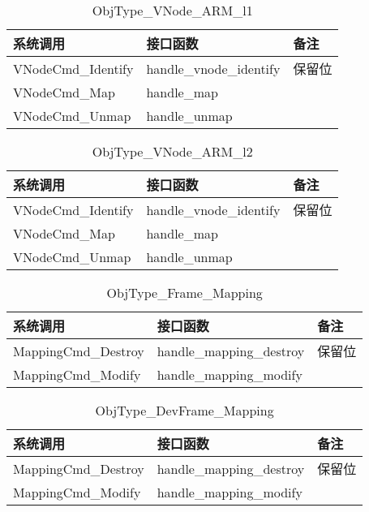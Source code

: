 \documentclass[a4paper, 12pt]{report}
\begin{document}
    \begin{table}[htbp]
        \centering
        \caption{ObjType\_VNode\_ARM\_l1}
        \begin{tabular}{lll}
            \toprule
            系统调用 & 接口函数 & 备注 \\
            \midrule
            VNodeCmd\_Identify & handle\_vnode\_identify & 保留位 \\
            VNodeCmd\_Map & handle\_map & \\
            VNodeCmd\_Unmap & handle\_unmap & \\
            \bottomrule
        \end{tabular}
    \end{table}
    
    \begin{table}[htbp]
        \centering
        \caption{ObjType\_VNode\_ARM\_l2}
        \begin{tabular}{lll}
            \toprule
            系统调用 & 接口函数 & 备注 \\
            \midrule
            VNodeCmd\_Identify & handle\_vnode\_identify & 保留位 \\
            VNodeCmd\_Map & handle\_map & \\
            VNodeCmd\_Unmap & handle\_unmap & \\
            \bottomrule
        \end{tabular}
    \end{table}
    
    \begin{table}[htbp]
        \centering
        \caption{ObjType\_Frame\_Mapping}
        \begin{tabular}{lll}
            \toprule
            系统调用 & 接口函数 & 备注 \\
            \midrule
            MappingCmd\_Destroy & handle\_mapping\_destroy & 保留位 \\
            MappingCmd\_Modify & handle\_mapping\_modify & \\
            \bottomrule
        \end{tabular}
    \end{table}
    
    \begin{table}[htbp]
        \centering
        \caption{ObjType\_DevFrame\_Mapping}
        \begin{tabular}{lll}
            \toprule
            系统调用 & 接口函数 & 备注 \\
            \midrule
            MappingCmd\_Destroy & handle\_mapping\_destroy & 保留位 \\
            MappingCmd\_Modify & handle\_mapping\_modify & \\
            \bottomrule
        \end{tabular}
    \end{table}
    
\end{document}
